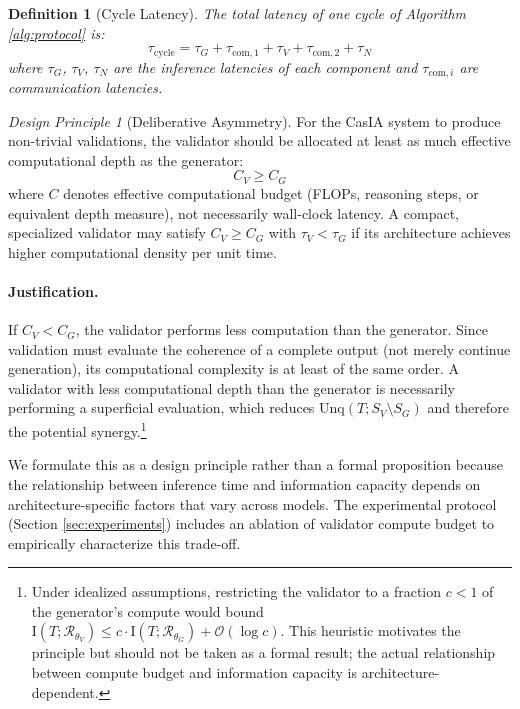 \documentclass[11pt,a4paper]{article}
\newtheorem{definition}{Definition}[section]
\theoremstyle{remark}
\newtheorem{principle}{Design Principle}[section]
\newcommand{\Unq}{\mathrm{Unq}}
\newcommand{\MI}{\mathrm{I}}
\begin{document}
\begin{definition}[Cycle Latency]
\label{def:latency}
The total latency of one cycle of Algorithm \ref{alg:protocol} is:
\begin{equation}
  \tau_{\text{cycle}} = \tau_G + \tau_{\text{com},1} + \tau_V + \tau_{\text{com},2} + \tau_N
\end{equation}
where $\tau_G$, $\tau_V$, $\tau_N$ are the inference latencies of each component and $\tau_{\text{com},i}$ are communication latencies.
\end{definition}

\begin{principle}[Deliberative Asymmetry]
\label{princ:asymmetry}
For the CasIA system to produce non-trivial validations, the validator should be allocated at least as much effective computational depth as the generator:
\begin{equation}
  C_V \geq C_G
\end{equation}
where $C$ denotes effective computational budget (FLOPs, reasoning steps, or equivalent depth measure), not necessarily wall-clock latency. A compact, specialized validator may satisfy $C_V \geq C_G$ with $\tau_V < \tau_G$ if its architecture achieves higher computational density per unit time.
\end{principle}

\paragraph{Justification.} If $C_V < C_G$, the validator performs less computation than the generator. Since validation must evaluate the coherence of a complete output (not merely continue generation), its computational complexity is at least of the same order. A validator with less computational depth than the generator is necessarily performing a superficial evaluation, which reduces $\Unq(T; S_V \setminus S_G)$ and therefore the potential synergy.\footnote{Under idealized assumptions, restricting the validator to a fraction $c < 1$ of the generator's compute would bound $\MI(T; \mathcal{R}_{\theta_V}) \leq c \cdot \MI(T; \mathcal{R}_{\theta_G}) + \mathcal{O}(\log c)$. This heuristic motivates the principle but should not be taken as a formal result; the actual relationship between compute budget and information capacity is architecture-dependent.}

We formulate this as a design principle rather than a formal proposition because the relationship between inference time and information capacity depends on architecture-specific factors that vary across models. The experimental protocol (Section \ref{sec:experiments}) includes an ablation of validator compute budget to empirically characterize this trade-off.
\end{document}
